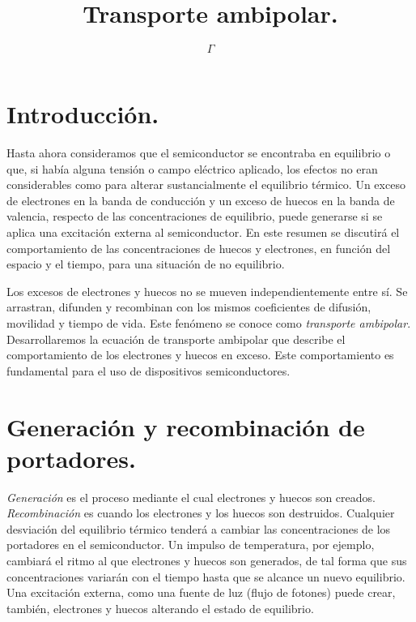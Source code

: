 \documentclass[12pt,a4paper]{article}
\begin{document}
\title{Transporte ambipolar.}

\author{$\Gamma$}

\maketitle

\section{Introducción.}

Hasta ahora consideramos que el semiconductor se encontraba en equilibrio o que, si había alguna tensión o campo eléctrico aplicado, los efectos no eran considerables como para alterar sustancialmente el equilibrio térmico. Un exceso de electrones en la banda de conducción y un exceso de huecos en la banda de valencia, respecto de las concentraciones de equilibrio, puede generarse si se aplica una excitación externa al semiconductor. En este resumen se discutirá el comportamiento de las concentraciones de huecos y electrones, en función del espacio y el tiempo, para una situación de no equilibrio.

Los excesos de electrones y huecos no se mueven independientemente entre sí. Se arrastran, difunden y recombinan con los mismos coeficientes de difusión, movilidad y tiempo de vida. Este fenómeno se conoce como \emph{transporte ambipolar}. Desarrollaremos la ecuación de transporte ambipolar que describe el comportamiento de los electrones y huecos en exceso. Este comportamiento es fundamental para el uso de dispositivos semiconductores.

\section{Generación y recombinación de portadores.}

\emph{Generación} es el proceso mediante el cual electrones y huecos son creados. \emph{Recombinación} es cuando los electrones y los huecos son destruidos. Cualquier desviación del equilibrio térmico tenderá a cambiar las concentraciones de los portadores en el semiconductor. Un impulso de temperatura, por ejemplo, cambiará el ritmo al que electrones y huecos son generados, de tal forma que sus concentraciones variarán con el tiempo hasta que se alcance un nuevo equilibrio. Una excitación externa, como una fuente de luz (flujo de fotones) puede crear, también, electrones y huecos alterando el estado de equilibrio.
\end{document}
